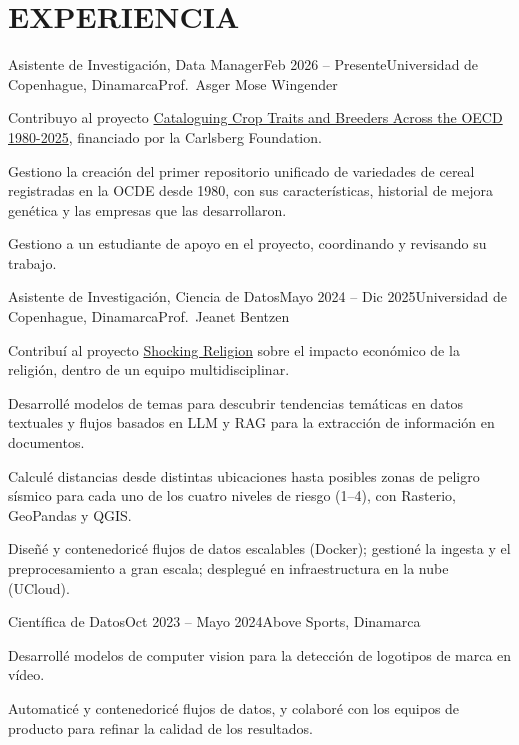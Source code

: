 \documentclass{resume}
\begin{document}
\section{EXPERIENCIA}
\begin{content}

    \begin{position}{Asistente de Investigación, Data Manager}{Feb 2026 -- Presente}{Universidad de Copenhague, Dinamarca}{Prof.~Asger Mose Wingender}{}
        \item Contribuyo al proyecto {\href{https://www.carlsbergfondet.dk/en/what-we-have-funded/cf25-1677/}{Cataloguing Crop Traits and Breeders Across the OECD 1980-2025}}, financiado por la Carlsberg Foundation.
        \item Gestiono la creación del primer repositorio unificado de variedades de cereal registradas en la OCDE desde 1980, con sus características, historial de mejora genética y las empresas que las desarrollaron.
        \item Gestiono a un estudiante de apoyo en el proyecto, coordinando y revisando su trabajo.
    \end{position}

    \begin{position}{Asistente de Investigación, Ciencia de Datos}{Mayo 2024 -- Dic 2025}{Universidad de Copenhague, Dinamarca}{Prof.~Jeanet Bentzen}{}
        \item Contribuí al proyecto {\href{https://www.economics.ku.dk/research/externally-funded-research_new/shocking-religion/}{Shocking Religion}} sobre el impacto económico de la religión, dentro de un equipo multidisciplinar.
        \item Desarrollé modelos de temas para descubrir tendencias temáticas en datos textuales y flujos basados en LLM y RAG para la extracción de información en documentos.
        \item Calculé distancias desde distintas ubicaciones hasta posibles zonas de peligro sísmico para cada uno de los cuatro niveles de riesgo (1--4), con Rasterio, GeoPandas y QGIS.
        \item Diseñé y contenedoricé flujos de datos escalables (Docker); gestioné la ingesta y el preprocesamiento a gran escala; desplegué en infraestructura en la nube (UCloud).
    \end{position}

    \begin{position}{Científica de Datos}{Oct 2023 -- Mayo 2024}{Above Sports, Dinamarca}{}{}
        \item Desarrollé modelos de computer vision para la detección de logotipos de marca en vídeo.
        \item Automaticé y contenedoricé flujos de datos, y colaboré con los equipos de producto para refinar la calidad de los resultados.
    \end{position}


\end{content}
\end{document}
